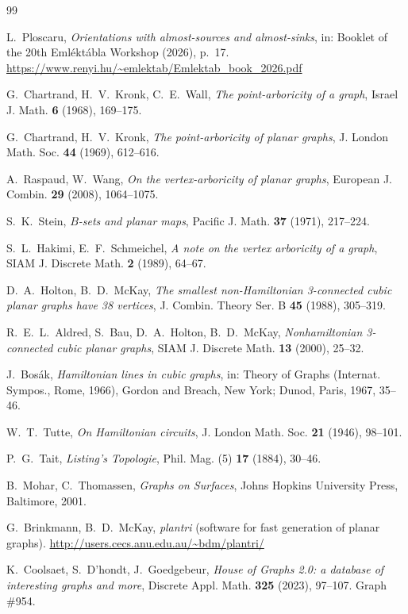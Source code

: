 \documentclass[11pt]{article}
\theoremstyle{remark}
\begin{document}
\begin{thebibliography}{99}

 L.~Ploscaru, \emph{Orientations with almost-sources and
almost-sinks}, in: Booklet of the 20th Eml\'ekt\'abla Workshop (2026),
p.~17. \url{https://www.renyi.hu/~emlektab/Emlektab_book_2026.pdf}

 G.~Chartrand, H.~V.~Kronk, C.~E.~Wall, \emph{The
point-arboricity of a graph}, Israel J. Math. \textbf{6} (1968),
169--175.

 G.~Chartrand, H.~V.~Kronk, \emph{The point-arboricity of
planar graphs}, J. London Math. Soc. \textbf{44} (1969), 612--616.

 A.~Raspaud, W.~Wang, \emph{On the vertex-arboricity of
planar graphs}, European J. Combin. \textbf{29} (2008), 1064--1075.

 S.~K.~Stein, \emph{$B$-sets and planar maps}, Pacific
J. Math. \textbf{37} (1971), 217--224.

 S.~L.~Hakimi, E.~F.~Schmeichel, \emph{A note on the
vertex arboricity of a graph}, SIAM J. Discrete Math. \textbf{2} (1989),
64--67.

 D.~A.~Holton, B.~D.~McKay, \emph{The smallest
non-Hamiltonian 3-connected cubic planar graphs have 38 vertices},
J. Combin. Theory Ser. B \textbf{45} (1988), 305--319.

 R.~E.~L.~Aldred, S.~Bau, D.~A.~Holton, B.~D.~McKay,
\emph{Nonhamiltonian 3-connected cubic planar graphs}, SIAM J.
Discrete Math. \textbf{13} (2000), 25--32.

 J.~Bos\'ak, \emph{Hamiltonian lines in cubic graphs},
in: Theory of Graphs (Internat. Sympos., Rome, 1966), Gordon and Breach,
New York; Dunod, Paris, 1967, 35--46.

 W.~T.~Tutte, \emph{On Hamiltonian circuits}, J. London
Math. Soc. \textbf{21} (1946), 98--101.

 P.~G.~Tait, \emph{Listing's Topologie}, Phil. Mag. (5)
\textbf{17} (1884), 30--46.

 B.~Mohar, C.~Thomassen, \emph{Graphs on Surfaces}, Johns
Hopkins University Press, Baltimore, 2001.

 G.~Brinkmann, B.~D.~McKay, \emph{plantri} (software
for fast generation of planar graphs).
\url{http://users.cecs.anu.edu.au/~bdm/plantri/}

 K.~Coolsaet, S.~D'hondt, J.~Goedgebeur, \emph{House of
Graphs 2.0: a database of interesting graphs and more}, Discrete Appl.
Math. \textbf{325} (2023), 97--107. Graph \#954.


\end{thebibliography}
\end{document}
